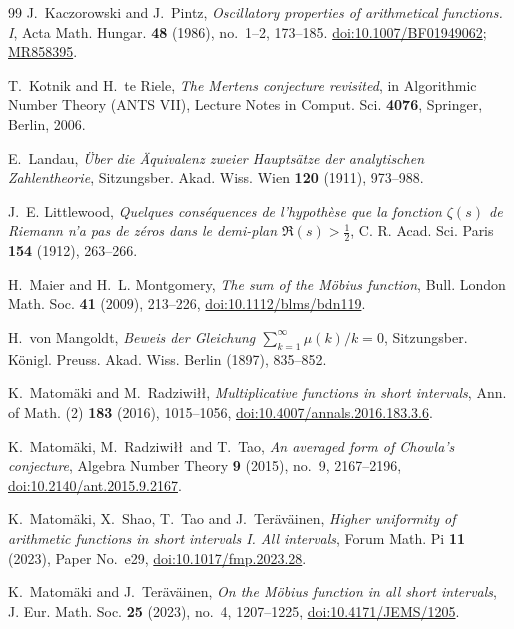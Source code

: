 \documentclass[11pt,reqno]{amsart}
\numberwithin{equation}{section}
\theoremstyle{plain}
\theoremstyle{definition}
\theoremstyle{remark}
\begin{document}
\begin{thebibliography}{99}
J.~Kaczorowski and J.~Pintz, \emph{Oscillatory properties of arithmetical
functions. I}, Acta Math. Hungar. \textbf{48} (1986), no.~1--2, 173--185.
\href{https://doi.org/10.1007/BF01949062}{doi:10.1007/BF01949062};
\href{https://mathscinet.ams.org/mathscinet-getitem?mr=858395}{MR858395}.

T.~Kotnik and H.~te Riele, \emph{The Mertens conjecture revisited}, in
Algorithmic Number Theory (ANTS VII), Lecture Notes in Comput. Sci.
\textbf{4076}, Springer, Berlin, 2006.

E.~Landau, \emph{\"Uber die \"Aquivalenz zweier Haupts\"atze der analytischen
Zahlentheorie}, Sitzungsber. Akad. Wiss. Wien \textbf{120} (1911), 973--988.

J.~E. Littlewood, \emph{Quelques cons\'equences de l'hypoth\`ese que la
fonction $\zeta(s)$ de Riemann n'a pas de z\'eros dans le demi-plan
$\Re(s)>\frac12$}, C. R. Acad. Sci. Paris \textbf{154} (1912), 263--266.

H.~Maier and H.~L. Montgomery, \emph{The sum of the M\"obius function},
Bull. London Math. Soc. \textbf{41} (2009), 213--226,
\href{https://doi.org/10.1112/blms/bdn119}{doi:10.1112/blms/bdn119}.

H.~von Mangoldt, \emph{Beweis der Gleichung $\sum_{k=1}^\infty\mu(k)/k=0$},
Sitzungsber. K\"onigl. Preuss. Akad. Wiss. Berlin (1897), 835--852.

K.~Matom\"aki and M.~Radziwi\l\l, \emph{Multiplicative functions in short
intervals}, Ann. of Math. (2) \textbf{183} (2016), 1015--1056,
\href{https://doi.org/10.4007/annals.2016.183.3.6}{doi:10.4007/annals.2016.183.3.6}.

K.~Matom\"aki, M.~Radziwi\l\l\ and T.~Tao, \emph{An averaged form of Chowla's
conjecture}, Algebra Number Theory \textbf{9} (2015), no.~9, 2167--2196,
\href{https://doi.org/10.2140/ant.2015.9.2167}{doi:10.2140/ant.2015.9.2167}.

K.~Matom\"aki, X.~Shao, T.~Tao and J.~Ter\"av\"ainen, \emph{Higher uniformity
of arithmetic functions in short intervals I. All intervals}, Forum Math.
Pi \textbf{11} (2023), Paper No.~e29,
\href{https://doi.org/10.1017/fmp.2023.28}{doi:10.1017/fmp.2023.28}.

K.~Matom\"aki and J.~Ter\"av\"ainen, \emph{On the M\"obius function in all
short intervals}, J. Eur. Math. Soc. \textbf{25} (2023), no.~4, 1207--1225,
\href{https://doi.org/10.4171/JEMS/1205}{doi:10.4171/JEMS/1205}.


\end{thebibliography}
\end{document}

